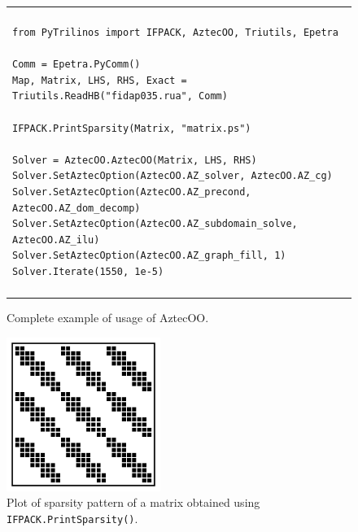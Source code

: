 \documentclass[acmtocl]{acmtrans2m}
\begin{document}
\begin{figure}
  \begin{center}
    \begin{tabular}{| p{12cm} |}
      \hline
      \\
      \footnotesize
      \begin{minipage}{11.5cm}
\begin{verbatim}
from PyTrilinos import IFPACK, AztecOO, Triutils, Epetra

Comm = Epetra.PyComm()
Map, Matrix, LHS, RHS, Exact = Triutils.ReadHB("fidap035.rua", Comm)

IFPACK.PrintSparsity(Matrix, "matrix.ps")

Solver = AztecOO.AztecOO(Matrix, LHS, RHS)
Solver.SetAztecOption(AztecOO.AZ_solver, AztecOO.AZ_cg)
Solver.SetAztecOption(AztecOO.AZ_precond, AztecOO.AZ_dom_decomp)
Solver.SetAztecOption(AztecOO.AZ_subdomain_solve, AztecOO.AZ_ilu)
Solver.SetAztecOption(AztecOO.AZ_graph_fill, 1)
Solver.Iterate(1550, 1e-5)
\end{verbatim}
      \end{minipage}
      \\
      \\
      \hline
    \end{tabular}
    \caption{Complete example of usage of AztecOO.}
    \label{fig:aztecoo}
  \end{center}
\end{figure}

\begin{figure}
  \begin{center}
    \includegraphics[height=5cm]{sparsity}
    \caption{Plot of sparsity pattern of a matrix obtained using
      {\tt IFPACK.PrintSparsity()}.}
    \label{fig:sparsity}
  \end{center}
\end{figure}

\medskip
\end{document}
